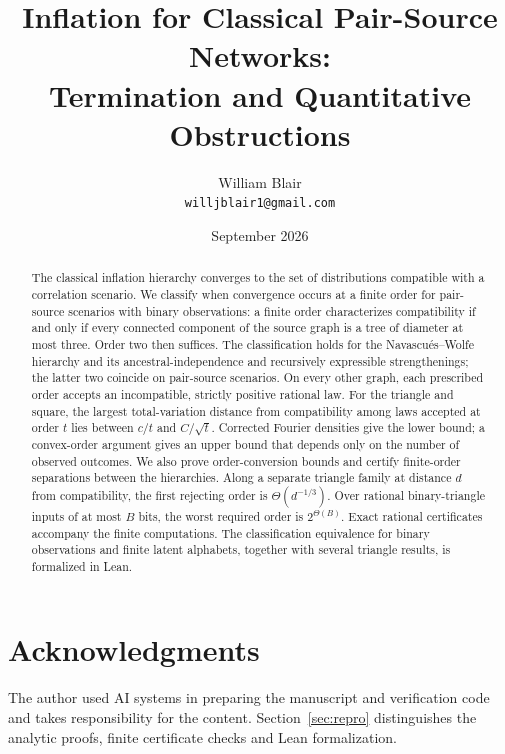 \documentclass[11pt]{article}
\title{Inflation for Classical Pair-Source Networks:\\ Termination and Quantitative Obstructions}
\author{William Blair\\[2pt]\small\texttt{willjblair1@gmail.com}}
\date{September 2026}
\theoremstyle{plain}
\theoremstyle{definition}
\begin{document}
\maketitle
\vspace{-1em}

\begin{abstract}
The classical inflation hierarchy converges to the set of distributions compatible with a correlation scenario. We classify when convergence occurs at a finite order for pair-source scenarios with binary observations: a finite order characterizes compatibility if and only if every connected component of the source graph is a tree of diameter at most three. Order two then suffices. The classification holds for the Navascués--Wolfe hierarchy and its ancestral-independence and recursively expressible strengthenings; the latter two coincide on pair-source scenarios. On every other graph, each prescribed order accepts an incompatible, strictly positive rational law. For the triangle and square, the largest total-variation distance from compatibility among laws accepted at order $t$ lies between $c/t$ and $C/\sqrt t$. Corrected Fourier densities give the lower bound; a convex-order argument gives an upper bound that depends only on the number of observed outcomes. We also prove order-conversion bounds and certify finite-order separations between the hierarchies. Along a separate triangle family at distance $d$ from compatibility, the first rejecting order is $\Theta(d^{-1/3})$. Over rational binary-triangle inputs of at most $B$ bits, the worst required order is $2^{\Theta(B)}$. Exact rational certificates accompany the finite computations. The classification equivalence for binary observations and finite latent alphabets, together with several triangle results, is formalized in Lean.
\end{abstract}

\begingroup
\footnotesize
\makeatletter
\renewcommand\l@section{\@dottedtocline{1}{0em}{1.8em}}
\makeatother
\tableofcontents
\endgroup
\clearpage










\clearpage
\appendix





\section*{Acknowledgments}
The author used AI systems in preparing the manuscript and verification code and takes responsibility for the content. Section~\ref{sec:repro} distinguishes the analytic proofs, finite certificate checks and Lean formalization.

\begingroup
\small
\raggedright


\endgroup
\end{document}
